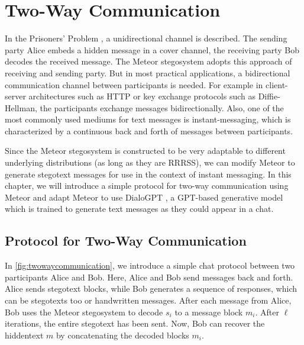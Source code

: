 \chapter{Two-Way Communication}
\label{chap:twowaycommunication}


In the Prisoners' Problem \cite{Simmons1983}, a unidirectional channel is described.
The sending party Alice embeds a hidden message in a cover channel, the receiving party Bob decodes the received message.
The Meteor stegosystem adopts this approach of receiving and sending party.
But in most practical applications, a bidirectional communication channel between participants is needed.
For example in client-server architectures such as HTTP or key exchange protocols such as Diffie-Hellman, the participants exchange messages bidirectionally.
Also, one of the most commonly used mediums for text messages is instant-messaging, which is characterized by a continuous back and forth of messages between participants.

Since the Meteor stegosystem is constructed to be very adaptable to different underlying distributions (as long as they are RRRSS), we can modify Meteor to generate stegotext messages for use in the context of instant messaging.
In this chapter, we will introduce a simple protocol for two-way communication using Meteor and adapt Meteor to use DialoGPT \cite{Zhang2020}, a GPT-based generative model which is trained to generate text messages as they could appear in a chat.

\section{Protocol for Two-Way Communication}

In \autoref{fig:twowaycommunication}, we introduce a simple chat protocol between two participants Alice and Bob.
Here, Alice and Bob send messages back and forth.
Alice sends stegotext blocks, while Bob generates a sequence of responses, which can be stegotexts too or handwritten messages.
After each message from Alice, Bob uses the Meteor stegosystem to decode $s_i$ to a message block $m_i$.
After $\ell$ iterations, the entire stegotext has been sent.
Now, Bob can recover the hiddentext $m$ by concatenating the decoded blocks $m_i$.



